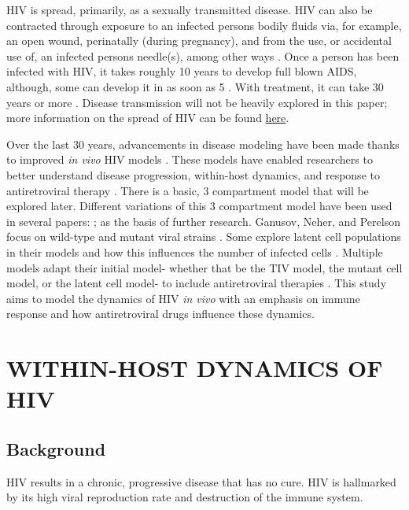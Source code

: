 \documentclass[letterpaper, 11 pt, conference]{ieeeconf}
\begin{document}
HIV is spread, primarily, as a sexually transmitted disease. HIV can also be contracted through exposure to an infected persons bodily fluids via, for example, an open wound, perinatally (during pregnancy), and from the use, or accidental use of, an infected persons needle(s), among other ways \cite{OriginsofPandemic}. Once a person has been infected with HIV, it takes roughly 10 years to develop full blown AIDS, although, some can develop it in as soon as 5 \cite{WHO}. With treatment, it can take 30 years or more \cite{cARVtimeline}. Disease transmission will not be heavily explored in this paper; more information on the spread of HIV can be found \href{https://www.researchgate.net/profile/Omar-Zakary/publication/290449186_On_the_impact_of_awareness_programs_in_HIVAIDS_prevention_an_SIR_model_with_optimal_control/links/56f01b8008ae3c653436686c/On-the-impact-of-awareness-programs-in-HIV-AIDS-prevention-an-SIR-model-with-optimal-control.pdf}{here}. 

Over the last 30 years, advancements in disease modeling have been made thanks to improved \emph{in vivo} HIV models \cite{TIVdiagram}. These models have enabled researchers to better understand disease progression, within-host dynamics, and response to antiretroviral therapy \cite{rong2007modeling}. There is a basic, 3 compartment model that will be explored later. Different variations of this 3 compartment model have been used in several papers: \cite{mclean2023infectious, TIVdiagram}; as the basis of further research. Ganusov, Neher, and Perelson focus on wild-type and mutant viral strains \cite{ganusov2013mathematical}. Some explore latent cell populations in their models and how this influences the number of infected cells \cite{rong2007modeling}. Multiple models adapt their initial model- whether that be the TIV model, the mutant cell model, or the latent cell model- to include antiretroviral therapies \cite{perelson1999, rong2007modeling, OCM, callaway2002hiv}. This study aims to model the dynamics of HIV \emph{in vivo} with an emphasis on immune response and how antiretroviral drugs influence these dynamics. 

\section{WITHIN-HOST DYNAMICS OF HIV}

\subsection{Background}
HIV results in a chronic, progressive disease that has no cure. HIV is hallmarked by its high viral reproduction rate and destruction of the immune system. 
\end{document}
